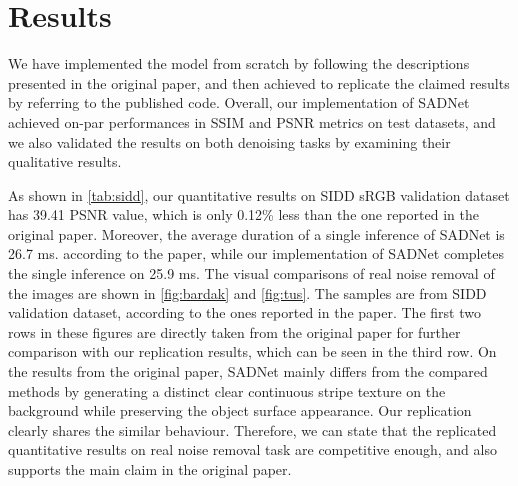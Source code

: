 \section{Results}

We have implemented the model from scratch by following the descriptions presented in the original paper, and then achieved to replicate the claimed results by referring to the published code. Overall, our implementation of SADNet achieved on-par performances in SSIM and PSNR metrics on test datasets, and we also validated the results on both denoising tasks by examining their qualitative results. 

As shown in \autoref{tab:sidd}, our quantitative results on SIDD sRGB validation dataset has 39.41 PSNR value, which is only 0.12\% less than the one reported in the original paper. Moreover, the average duration of a single inference of SADNet is 26.7 ms. according to the paper, while our implementation of SADNet completes the single inference on 25.9 ms. The visual comparisons of real noise removal of the images are shown in \autoref{fig:bardak} and \autoref{fig:tus}. The samples are from SIDD validation dataset, according to the ones reported in the paper. The first two rows in these figures are directly taken from the original paper for further comparison with our replication results, which can be seen in the third row. On the results from the original paper, SADNet mainly differs from the compared methods by generating a distinct clear continuous stripe texture on the background while preserving the object surface appearance. Our replication clearly shares the similar behaviour. Therefore, we can state that the replicated quantitative results on real noise removal task are competitive enough, and also supports the main claim in the original paper.


